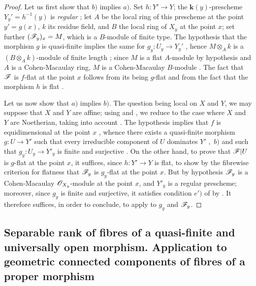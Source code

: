 \begin{proof}
\label{IV.15.4.3-proof}
Let us first show that $b)$ implies $a)$.
Set $h:Y'\to Y$; the $\boldsymbol{k}(y)$-prescheme $Y_y'=h^{-1}(y)$ is \emph{regular} ; let $A$ be the local ring of this prescheme at the point $y'=g(x)$, $k$ its residue field, and $B$ the local ring of $X_y$ at the point $x$; set further $(\mathscr{F}_y)_x=M$, which is a $B$-module of finite type.
The hypothesis that the morphism $g$ is quasi-finite implies the same for $g_y:U_y\to Y_y'$ , hence $M\otimes_A k$ is a $(B\otimes_A k)$-module of finite length ; since $M$ is a flat $A$-module by hypothesis and $A$ is a Cohen-Macaulay ring, $M$ is a Cohen-Macaulay $B$-module .
The fact that $\mathscr{F}$ is $f$-flat at the point $x$ follows from its being $g$-flat and from the fact that the morphism $h$ is flat .

Let us now show that $a)$ implies $b)$.
The question being local on $X$ and $Y$, we may suppose that $X$ and $Y$ are affine; using  and , we reduce to the case where $X$ and $Y$ are Noetherian, taking into account .
The hypothesis implies that $f$ is equidimensional at the point $x$ , whence there exists a quasi-finite morphism $g:U\to Y'$ such that every irreducible component of $U$ dominates $Y'$ ,~$b)$ and such that $g_y:U_y\to Y'_y$ is finite and surjective .
On the other hand, to prove that $\mathscr{F}|U$ is $g$-flat at the point $x$, it suffices, since $h:Y'\to Y$ is flat, to show by the fibrewise criterion for flatness  that $\mathscr{F}_y$ is $g_y$-flat at the point $x$.
But by hypothesis $\mathscr{F}_y$ is a Cohen-Macaulay $\mathscr{O}_{X_y}$-module at the point $x$, and $Y'_y$ is a regular prescheme; moreover, since $g_y$ is finite and surjective, it satisfies condition $e')$ of  by .
It therefore suffices, in order to conclude, to apply  to $g_y$ and $\mathscr{F}_y$.
\end{proof}
\subsection{Separable rank of fibres of a quasi-finite and universally open morphism. Application to geometric connected components of fibres of a proper morphism}
\label{subsection:IV.15.5}

